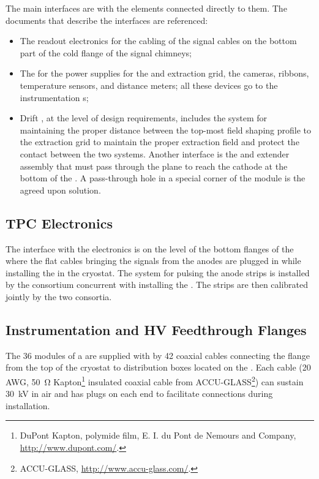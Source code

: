The main  interfaces are with the elements connected directly to them. The documents that describe the interfaces are referenced:
\begin{itemize}
\item The readout electronics for the cabling of the signal cables on the bottom part of the cold 
flange of the signal chimneys; 
\item The  for the power supplies for the  and extraction grid, the cameras,  ribbons, temperature sensors, and distance meters; all these devices go to the  instrumentation \fdth{}s; 

\item Drift , at the level of design requirements, includes the system for maintaining the proper distance between the top-most field shaping profile to the extraction grid to maintain the proper extraction field and protect the contact between the two systems. Another interface is the  \fdth{} and extender assembly that must pass through the  plane to reach the cathode at the bottom of the .  A pass-through hole in a special corner of the  module is the agreed upon solution.
\end{itemize}

\subsection{TPC Electronics}
\label{sec:dp-crp-intfc-elec}

The interface with the   electronics is on the level of the bottom flanges of the  where the flat cables bringing the signals from the anodes are plugged in while installing the  in the cryostat. The system for %
pulsing the anode strips is installed by the  consortium 
concurrent with installing the . 
The strips are then calibrated jointly by the two consortia.

\subsection{Instrumentation and HV Feedthrough Flanges}
\label{sec:dp-crp-intfc-FT}

The \num{36}  modules of a  are supplied with  by \num{42} coaxial cables 
connecting the \fdth flange from the top of the cryostat to distribution boxes located on the . Each cable (\num{20}\,AWG, \SI{50}{\ohm} Kapton\footnote{DuPont\texttrademark{} Kapton, polymide film,  E. I. du Pont de Nemours and Company,  \url{http://www.dupont.com/}.} insulated coaxial cable from ACCU-GLASS\footnote{ACCU-GLASS\texttrademark{}, \url{http://www.accu-glass.com/}.}) can sustain \SI{30}{kV} in air and has  plugs on each end to facilitate connections during  installation.

